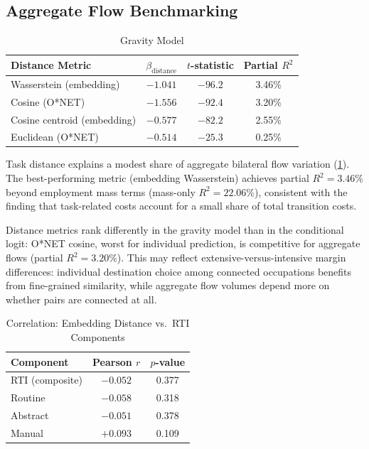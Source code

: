 \documentclass[12pt]{article}
\begin{document}
\subsection{Aggregate Flow Benchmarking}
\label{subsec:gravity}


\begin{table}[h!]
\centering
\caption{Gravity Model}
\label{tab:gravity-comparison}
\begin{tabular}{lccc}
\toprule
\textbf{Distance Metric} & $\beta_{\mathrm{distance}}$ & $t$-statistic & Partial $R^2$ \\
\midrule
Wasserstein (embedding) & $-1.041$ & $-96.2$ & 3.46\% \\
Cosine (O*NET) & $-1.556$ & $-92.4$ & 3.20\% \\
Cosine centroid (embedding) & $-0.577$ & $-82.2$ & 2.55\% \\
Euclidean (O*NET) & $-0.514$ & $-25.3$ & 0.25\% \\
\bottomrule
\end{tabular}
\end{table}


Task distance explains a modest share of aggregate bilateral flow variation (\cref{tab:gravity-comparison}). The best-performing metric (embedding Wasserstein) achieves partial $R^2 = 3.46\%$ beyond employment mass terms (mass-only $R^2 = 22.06\%$), consistent with the \citet{CortesGallipoli2018} finding that task-related costs account for a small share of total transition costs.

Distance metrics rank differently in the gravity model than in the conditional logit: O*NET cosine, worst for individual prediction, is competitive for aggregate flows (partial $R^2 = 3.20\%$). This may reflect extensive-versus-intensive margin differences: individual destination choice among connected occupations benefits from fine-grained similarity, while aggregate flow volumes depend more on whether pairs are connected at all.


\begin{table}[h!]
\centering
\caption{Correlation: Embedding Distance vs.\ RTI Components}
\label{tab:rti-correlation}
\begin{tabular}{lcc}
\toprule
\textbf{Component} & \textbf{Pearson $r$} & \textbf{$p$-value} \\
\midrule
RTI (composite) & $-0.052$ & 0.377 \\
Routine & $-0.058$ & 0.318 \\
Abstract & $-0.051$ & 0.378 \\
Manual & $+0.093$ & 0.109 \\
\bottomrule
\end{tabular}
\end{table}
\end{document}
